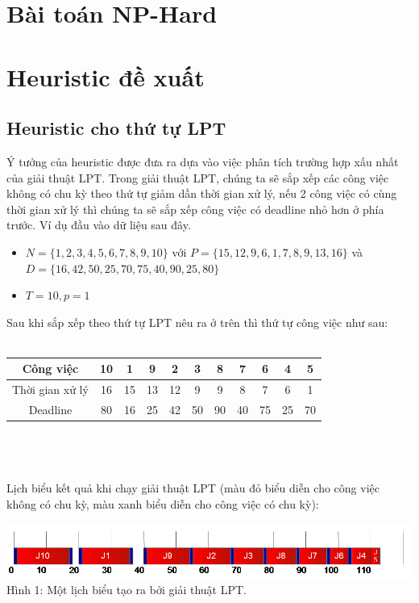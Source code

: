 \documentclass[a4paper,12pt]{article}
\begin{document}
\section{Bài toán NP-Hard}
\section{Heuristic đề xuất}
\subsection{Heuristic cho thứ tự LPT}
Ý tưởng của heuristic được đưa ra dựa vào việc phân tích trường hợp xấu nhất của giải thuật LPT. Trong giải thuật LPT, chúng ta sẽ sắp xếp các công việc không có chu kỳ theo thứ tự giảm dần thời gian xử lý, nếu 2 công việc có cùng thời gian xử lý thì chúng ta sẽ sắp xếp công việc có deadline nhỏ hơn ở phía trước. Ví dụ đầu vào dữ liệu sau đây.

\begin{itemize}
\item
$N = \{1, 2, 3, 4, 5, 6, 7, 8, 9, 10\}$ với $P = \{15, 12, 9, 6, 1, 7, 8, 9, 13, 16\}$ và\\ $D = \{16, 42, 50, 25, 70, 75, 40, 90, 25, 80\}$
\item
$T = 10, p = 1$
\end{itemize}

Sau khi sắp xếp theo thứ tự LPT nêu ra ở trên thì thứ tự công việc như sau:\\\\
\begin{tabular}{|c|c|c|c|c|c|c|c|c|c|c|}
\hline
Công việc&10&1&9&2&3&8&7&6&4&5\\
\hline
Thời gian xử lý&16&15&13&12&9&9&8&7&6&1\\
\hline
Deadline&80&16&25&42&50&90&40&75&25&70\\
\hline
\end{tabular}
\\\\\\
Lịch biểu kết quả khi chạy giải thuật LPT (màu đỏ biểu diễn cho công việc không có chu kỳ, màu xanh biểu diễn cho công việc có chu kỳ):
\begin{center}
\includegraphics[scale=0.65]{Fig_1.png}
\\
Hình 1: Một lịch biểu tạo ra bởi giải thuật LPT.
\end{center}
\end{document}
